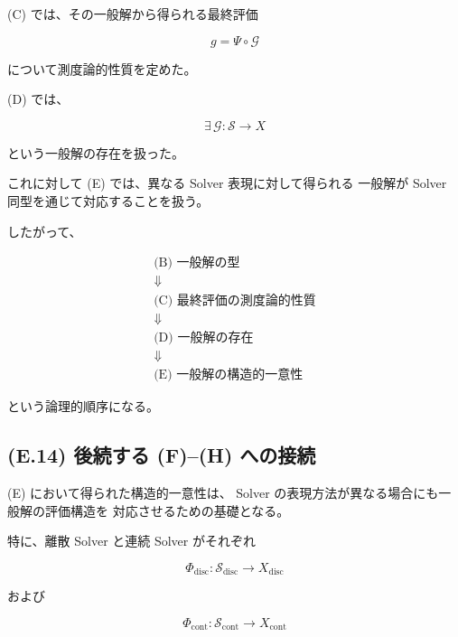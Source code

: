 \documentclass[a4paper,11pt]{article}
\newcommand{\Solver}{\mathcal{S}}
\begin{document}
(C) では、その一般解から得られる最終評価

\begin{equation}
    g
    =
    \Psi\circ\mathcal{G}
\end{equation}

について測度論的性質を定めた。

(D) では、

\begin{equation}
    \exists\,
    \mathcal{G}:
    \Solver\to X
\end{equation}

という一般解の存在を扱った。

これに対して (E) では、異なる Solver 表現に対して得られる
一般解が Solver 同型を通じて対応することを扱う。

したがって、

\begin{equation}
    \boxed{
    \begin{array}{c}
        \text{(B) 一般解の型}\\
        \Downarrow\\
        \text{(C) 最終評価の測度論的性質}\\
        \Downarrow\\
        \text{(D) 一般解の存在}\\
        \Downarrow\\
        \text{(E) 一般解の構造的一意性}
    \end{array}
    }
\end{equation}

という論理的順序になる。


\subsection{(E.14) 後続する (F)--(H) への接続}
\label{subsec:E14}

(E) において得られた構造的一意性は、
Solver の表現方法が異なる場合にも一般解の評価構造を
対応させるための基礎となる。

特に、離散 Solver と連続 Solver がそれぞれ

\begin{equation}
    \Phi_{\mathrm{disc}}
    :
    \Solver_{\mathrm{disc}}
    \to
    X_{\mathrm{disc}}
\end{equation}

および

\begin{equation}
    \Phi_{\mathrm{cont}}
    :
    \Solver_{\mathrm{cont}}
    \to
    X_{\mathrm{cont}}
\end{equation}
\end{document}
